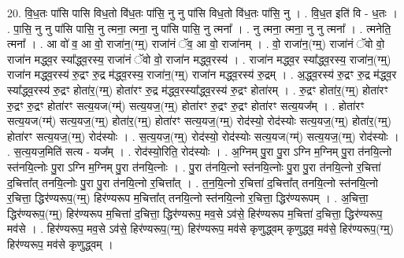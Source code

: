 \documentclass[17pt]{extarticle}
\begin{document}
20. वि॒ध॒तः पा॑सि पासि विध॒तो वि॑ध॒तः पा॑सि॒ नु नु पा॑सि विध॒तो वि॑ध॒तः पा॑सि॒ नु । . वि॒ध॒त इति॑ वि - ध॒तः । . पा॒सि॒ नु नु पा॑सि पासि॒ नु त्मना॒ त्मना॒ नु पा॑सि पासि॒ नु त्मना᳚ । . नु त्मना॒ त्मना॒ नु नु त्मना᳚ । . त्मनेति॒ त्मना᳚ । . आ वो॑ व॒ आ वो॒ राजा॑न॒(ग्म्॒) राजा॑नं ॅव॒ आ वो॒ राजा॑नम् । . वो॒ राजा॑न॒(ग्म्॒) राजा॑नं ॅवो वो॒ राजा॑न मद्ध्व॒र स्या᳚द्ध्व॒रस्य॒ राजा॑नं ॅवो वो॒ राजा॑न मद्ध्व॒रस्य॑ । . राजा॑न मद्ध्व॒र स्या᳚द्ध्व॒रस्य॒ राजा॑न॒(ग्म्॒) राजा॑न मद्ध्व॒रस्य॑ रु॒द्रꣳ रु॒द्र म॑द्ध्व॒रस्य॒ राजा॑न॒(ग्म्॒) राजा॑न मद्ध्व॒रस्य॑ रु॒द्रम् । . अ॒द्ध्व॒रस्य॑ रु॒द्रꣳ रु॒द्र म॑द्ध्व॒र स्या᳚द्ध्व॒रस्य॑ रु॒द्रꣳ होता॑र॒(ग्म्॒) होता॑रꣳ रु॒द्र 
म॑द्ध्व॒रस्या᳚द्ध्व॒रस्य॑ रु॒द्रꣳ होता॑रम् । . रु॒द्रꣳ होता॑र॒(ग्म्॒) होता॑रꣳ रु॒द्रꣳ रु॒द्रꣳ होता॑रꣳ सत्य॒यज(ग्म्॑) सत्य॒यज॒(ग्म्॒) होता॑रꣳ रु॒द्रꣳ रु॒द्रꣳ होता॑रꣳ सत्य॒यज᳚म् । . होता॑रꣳ सत्य॒यज(ग्म्॑) सत्य॒यज॒(ग्म्॒) होता॑र॒(ग्म्॒) होता॑रꣳ सत्य॒यज॒(ग्म्॒) रोद॑स्यो॒ रोद॑स्योः सत्य॒यज॒(ग्म्॒) होता॑र॒(ग्म्॒) होता॑रꣳ सत्य॒यज॒(ग्म्॒) रोद॑स्योः । . स॒त्य॒यज॒(ग्म्॒) रोद॑स्यो॒ रोद॑स्योः सत्य॒यज(ग्म्॑) सत्य॒यज॒(ग्म्॒) रोद॑स्योः । . स॒त्य॒यज॒मिति॑ सत्य - यज᳚म् । . रोद॑स्यो॒रिति॒ रोद॑स्योः । . अ॒ग्निम् पु॒रा पु॒रा ऽग्नि म॒ग्निम् पु॒रा त॑नयि॒त्नो स्त॑नयि॒त्नोः पु॒रा ऽग्नि म॒ग्निम् पु॒रा त॑नयि॒त्नोः । . पु॒रा त॑नयि॒त्नो स्त॑नयि॒त्नोः पु॒रा पु॒रा त॑नयि॒त्नो र॒चित्ता॑ द॒चित्ता᳚त् तनयि॒त्नोः पु॒रा पु॒रा त॑नयि॒त्नो र॒चित्ता᳚त् । . त॒न॒यि॒त्नो र॒चित्ता॑ द॒चित्ता᳚त् तनयि॒त्नो स्त॑नयि॒त्नो र॒चित्ता॒ द्धिर॑ण्यरूप॒(ग्म्॒) हिर॑ण्यरूप म॒चित्ता᳚त् तनयि॒त्नो स्त॑नयि॒त्नो र॒चित्ता॒ द्धिर॑ण्यरूपम् । . अ॒चित्ता॒ द्धिर॑ण्यरूप॒(ग्म्॒) हिर॑ण्यरूप म॒चित्ता॑ द॒चित्ता॒ द्धिर॑ण्यरूप॒ मव॒से ऽव॑से॒ हिर॑ण्यरूप म॒चित्ता॑ द॒चित्ता॒ द्धिर॑ण्यरूप॒ मव॑से । . हिर॑ण्यरूप॒ मव॒से ऽव॑से॒ हिर॑ण्यरूप॒(ग्म्॒) हिर॑ण्यरूप॒ मव॑से कृणुद्ध्वम् कृणुद्ध्व॒ मव॑से॒ हिर॑ण्यरूप॒(ग्म्॒) हिर॑ण्यरूप॒ मव॑से कृणुद्ध्वम् । \newline
\end{document}
